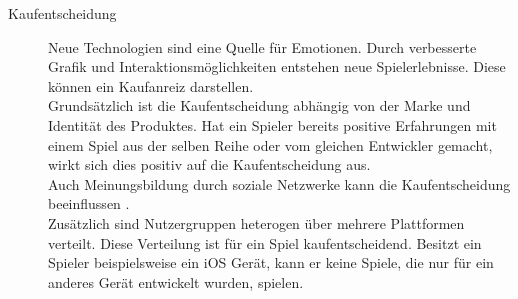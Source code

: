 \begin{description}
\item[Kaufentscheidung]



Neue Technologien sind eine Quelle für Emotionen. Durch verbesserte Grafik und Interaktionsmöglichkeiten entstehen neue Spielerlebnisse. Diese können ein Kaufanreiz darstellen. \\
Grundsätzlich ist die Kaufentscheidung abhängig von der Marke und Identität des Produktes. Hat ein Spieler bereits positive Erfahrungen mit einem Spiel aus der selben Reihe oder vom gleichen Entwickler gemacht, wirkt sich dies positiv auf die Kaufentscheidung aus. \\
Auch Meinungsbildung durch soziale Netzwerke kann die Kaufentscheidung beeinflussen \cite[S. 13]{Bernhaupt:2010vi}. \\
Zusätzlich sind Nutzergruppen heterogen über mehrere Plattformen verteilt. Diese Verteilung ist für ein Spiel kaufentscheidend. Besitzt ein Spieler beispielsweise ein iOS Gerät, kann er keine Spiele, die nur für ein anderes Gerät entwickelt wurden, spielen. 








\end{description}
